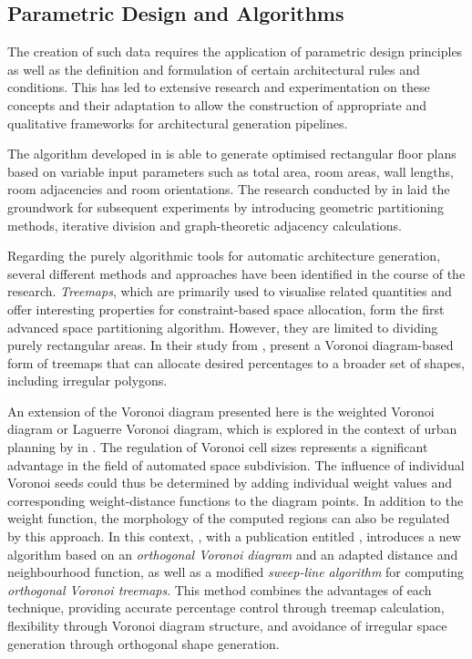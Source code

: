\documentclass[a4paper, 12pt]{report}
\begin{document}
\subsection{Parametric Design and Algorithms}\label{subsec:parametric-design-and-algorithms}

The creation of such data requires the application of parametric design principles as well as the definition and formulation of certain architectural rules and conditions. This has led to extensive research and experimentation on these concepts and their adaptation to allow the construction of appropriate and qualitative frameworks for architectural generation pipelines.

The algorithm developed in  is able to generate optimised rectangular floor plans based on variable input parameters such as total area, room areas, wall lengths, room adjacencies and room orientations. The research conducted by \citeauthor{galle1981algorithm} in \citeyear{galle1981algorithm} laid the groundwork for subsequent experiments by introducing geometric partitioning methods, iterative division and graph-theoretic adjacency calculations.

Regarding the purely algorithmic tools for automatic architecture generation, several different methods and approaches have been identified in the course of the research. \textit{Treemaps}, which are primarily used to visualise related quantities and offer interesting properties for constraint-based space allocation, form the first advanced space partitioning algorithm. However, they are limited to dividing purely rectangular areas. In their study from \citeyear{balzer2005voronoi}, \citeauthor{balzer2005voronoi} present a Voronoi diagram-based form of treemaps that can allocate desired percentages to a broader set of shapes, including irregular polygons.

An extension of the Voronoi diagram presented here is the weighted Voronoi diagram or Laguerre Voronoi diagram, which is explored in the context of urban planning by \citeauthor{anuradha2008voronoi} in \citeyear{anuradha2008voronoi}. The regulation of Voronoi cell sizes represents a significant advantage in the field of automated space subdivision. The influence of individual Voronoi seeds could thus be determined by adding individual weight values and corresponding weight-distance functions to the diagram points. In addition to the weight function, the morphology of the computed regions can also be regulated by this approach. In this context, \citeauthor{wang2019orthogonal}, with a publication entitled , introduces a new algorithm based on an \textit{orthogonal Voronoi diagram} and an adapted distance and neighbourhood function, as well as a modified \textit{sweep-line algorithm} for computing \textit{orthogonal Voronoi treemaps}. This method combines the advantages of each technique, providing accurate percentage control through treemap calculation, flexibility through Voronoi diagram structure, and avoidance of irregular space generation through orthogonal shape generation.
\end{document}
